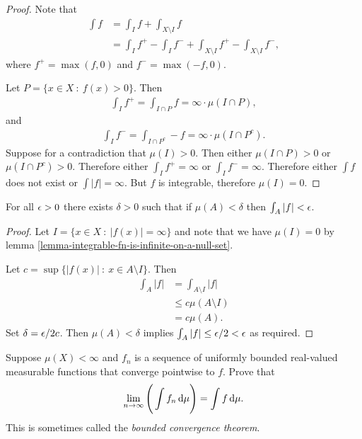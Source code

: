\begin{proof}
  Note that
  \begin{align*}
    \int f &= \int_I f + \int_{X \setminus I} f \\
           &= \int_I f^+ - \int_I f^- + \int_{X \setminus I} f^+ - \int_{X \setminus I} f^-,
  \end{align*}
  where $f^+ = \max(f, 0)$ and $f^- = \max(-f, 0)$.

  Let $P = \{x \in X ~:~ f(x) > 0 \}$. Then
  \begin{align*}
    \int_I f^+ = \int_{I \cap P} f = \infty \cdot \mu(I \cap P),
  \end{align*}
  and
  \begin{align*}
    \int_I f^- = \int_{I \cap P^c} -f = \infty \cdot \mu(I \cap P^c).
  \end{align*}
  Suppose for a contradiction that $\mu(I) > 0$. Then either $\mu(I \cap P) > 0$ or $\mu(I \cap P^c) > 0$.
  Therefore either $\int_I f^+ = \infty$ or $\int_I f^- = \infty$. Therefore either $\int f$ does not exist
  or $\int |f| = \infty$. But $f$ is integrable, therefore $\mu(I) = 0$.
\end{proof}

\begin{claim*}
  For all $\epsilon > 0$ there exists $\delta > 0$ such that if $\mu(A) < \delta$ then $\int_A |f| < \epsilon$.
\end{claim*}

\begin{proof}
  Let $I = \{x \in X ~:~ |f(x)| = \infty \}$ and note that we have $\mu(I) = 0$ by lemma
  \eqref{lemma-integrable-fn-is-infinite-on-a-null-set}.

  Let $c = \sup \{|f(x)| ~:~ x \in A \setminus I\}$. Then
  \begin{align*}
    \int_A |f| &= \int_{A\setminus I} |f| \\
               &\leq c\mu(A \setminus I) \\
               &= c\mu(A).
  \end{align*}
  Set $\delta = \epsilon/2c$. Then $\mu(A) < \delta$ implies $\int_A |f| \leq \epsilon/2 < \epsilon$ as required.
\end{proof}

\newpage
\begin{mdframed}
  Suppose $\mu(X) < \infty$ and $f_n$ is a sequence of uniformly bounded real-valued measurable functions that
  converge pointwise to $f$. Prove that
\begin{align*}
  \lim_{n \to \infty} \Bigg( \int f_n \d\mu \Bigg) = \int f \d\mu.
\end{align*}
  This is sometimes called the {\it bounded convergence theorem}.
\end{mdframed}


